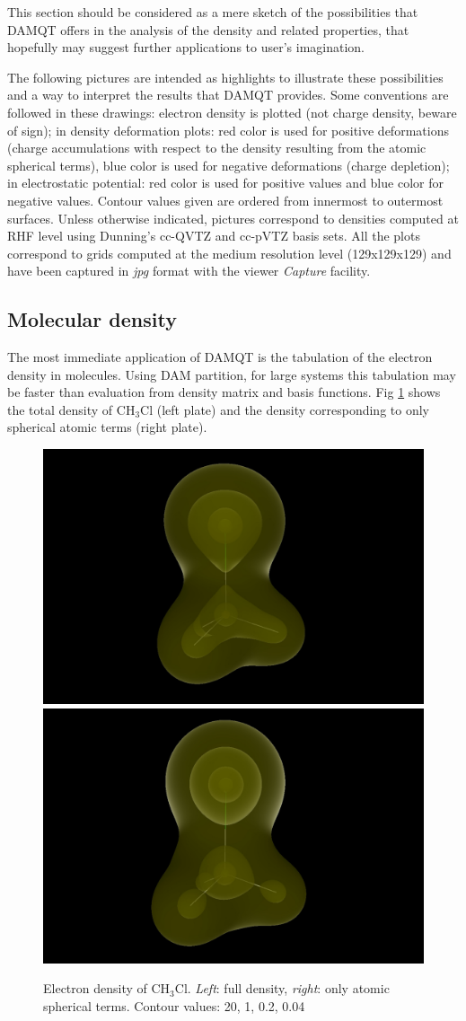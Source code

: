 \documentclass[10pt]{article}
\begin{document}
This section should be considered as a mere sketch of the possibilities that
DAMQT offers in the analysis of the density and related properties, that hopefully may suggest
further
applications to user's imagination.

The following pictures are intended as highlights to illustrate these
possibilities and a way to interpret the results that DAMQT provides. Some
conventions are followed in these drawings: electron density is plotted (not
charge density, beware of sign); in density deformation plots:
red color is used for positive deformations (charge accumulations with respect 
to the density resulting from the atomic spherical terms), blue color is
used for negative deformations (charge depletion); in electrostatic potential:
red color is used for positive values and blue color for negative values.
Contour values given are ordered from innermost to outermost surfaces.
Unless otherwise indicated, pictures correspond to densities computed
at RHF level using Dunning's cc-QVTZ and cc-pVTZ
basis sets\footnotemark{}.
All the plots correspond to grids computed at the medium resolution level
(129x129x129) and have been captured in {\it jpg} format with the viewer {\it
Capture} facility.


\subsection{Molecular density \label{sec:6.1}}

The most immediate application of DAMQT is the tabulation of the electron
density in molecules. Using DAM partition, for large systems this tabulation 
may be faster than evaluation from density matrix and basis functions. Fig 
\ref{fig:6_1_1} shows the total density of CH$_3$Cl (left plate) and the 
density corresponding to only spherical atomic terms (right plate).

\begin{figure}[H]
\vspace*{-2mm}
\begin{center}
\includegraphics[width=.33\linewidth]{CH3Cl-QVTZ-d-tot.png}
\hspace*{5mm}
\includegraphics[width=.33\linewidth]{CH3Cl-QVTZ-d-l0.png}
\end{center}
\caption[Electron density of CH$_3$Cl]{ Electron density of CH$_3$Cl. {\it Left}: full density, {\it right}:
only atomic spherical terms. Contour values: 20, 1, 0.2, 0.04
\label{fig:6_1_1}}
\end{figure}
\end{document}
